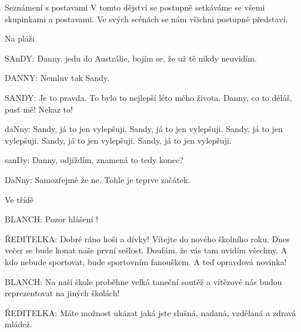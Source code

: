 ﻿\load[makra]
\load[mriezka]

\beginscenar




\makeindex
\endmulti

\maketoc


\act Seznámení s postavami
V tomto dějství se postupně setkáváme se všemi skupinkami a postavami. Ve svých scénách se nám všichni postupně představí.

\scene Na pláži

\rep SAnDY: Danny. jedu do Austrálie, bojím se, že už tě nikdy neuvidím. 

\rep DANNY: Nemluv tak Sandy.   

\rep SANDY: Je to pravda. To bylo to nejlepší léto mého života.  Danny, co to děláš, pusť mě! Nekaz to!

\rep daNny: Sandy, já to jen vylepšuji. Sandy, já to jen vylepšuji. Sandy, já to jen vylepšuji. Sandy, já to jen vylepšuji. Sandy, já to jen vylepšuji. 

\rep sanDy: Danny, odjíždím, znamená to tedy konec?

\rep DaNny: Samozřejmě že ne. Tohle je teprve začátek. 

\scene Ve třídě 

\rep BLANCH:            Pozor hlášení ! 

\rep ŘEDITELKA:                  Dobré ráno hoši a dívky! Vítejte do nového školního roku.
    Dnes večer se bude konat naše první sešlost. Doufám, že vás tam  uvidím všechny. A kdo nebude sportovat, bude sportovním fanouškem. A  teď opravdová novinka!  

\rep BLANCH:             Na naší škole proběhne velká taneční soutěž  a vítězové nás budou reprezentovat na jiných školách!

\rep ŘEDITELKA:         Máte možnost ukázat jaká jste slušná, nadaná, vzdělaná a zdravá mládež.       


\scene


